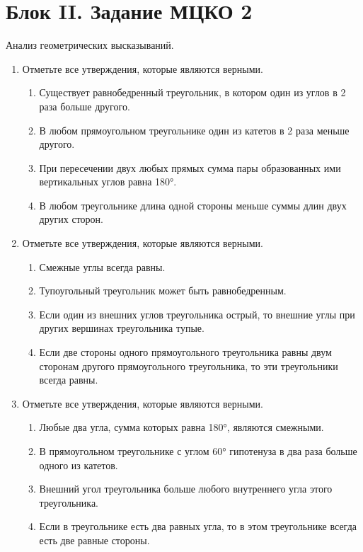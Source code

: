 \documentclass[a4paper,12pt]{article}
\newcommand{\taskspace}{\par\vspace{0.42cm}}
\newcommand{\blocknote}[1]{%
  {\color{soft}\small #1\par}\vspace{0.25cm}%
}
\begin{document}
\newpage

\section*{Блок II. Задание МЦКО 2}

\blocknote{Анализ геометрических высказываний.}

\begin{enumerate}[resume]

\item Отметьте все утверждения, которые являются верными.
\begin{enumerate}[label=\arabic*),leftmargin=8mm,itemsep=0.25em,topsep=0.35em]
\item Существует равнобедренный треугольник, в котором один из углов в 2 раза больше другого.
\item В любом прямоугольном треугольнике один из катетов в 2 раза меньше другого.
\item При пересечении двух любых прямых сумма пары образованных ими вертикальных углов равна 180°.
\item В любом треугольнике длина одной стороны меньше суммы длин двух других сторон.
\end{enumerate}

\taskspace

\item Отметьте все утверждения, которые являются верными.
\begin{enumerate}[label=\arabic*),leftmargin=8mm,itemsep=0.25em,topsep=0.35em]
\item Смежные углы всегда равны.
\item Тупоугольный треугольник может быть равнобедренным.
\item Если один из внешних углов треугольника острый, то внешние углы при других вершинах треугольника тупые.
\item Если две стороны одного прямоугольного треугольника равны двум сторонам другого прямоугольного треугольника, то эти треугольники всегда равны.
\end{enumerate}

\taskspace

\item Отметьте все утверждения, которые являются верными.
\begin{enumerate}[label=\arabic*),leftmargin=8mm,itemsep=0.25em,topsep=0.35em]
\item Любые два угла, сумма которых равна 180°, являются смежными.
\item В прямоугольном треугольнике с углом 60° гипотенуза в два раза больше одного из катетов.
\item Внешний угол треугольника больше любого внутреннего угла этого треугольника.
\item Если в треугольнике есть два равных угла, то в этом треугольнике всегда есть две равные стороны.
\end{enumerate}


\end{enumerate}
\end{document}
